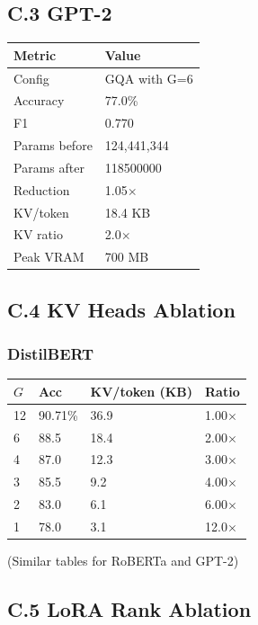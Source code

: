 \subsection{C.3 GPT-2}

\begin{table}[H]
\centering
\small
\begin{tabular}{ll}
\toprule
\textbf{Metric} & \textbf{Value} \\
\midrule
Config & GQA with G=6 \\
Accuracy & 77.0\% \\
F1 & 0.770 \\
Params before & 124,441,344 \\
Params after & 118500000 \\
Reduction & 1.05$\times$ \\
KV/token & 18.4 KB \\
KV ratio & 2.0$\times$ \\
Peak VRAM & 700 MB \\
\bottomrule
\end{tabular}
\end{table}

\subsection{C.4 KV Heads Ablation}

\subsubsection{DistilBERT}
\begin{table}[H]
\centering
\small
\begin{tabular}{llll}
\toprule
\textbf{$G$} & \textbf{Acc} & \textbf{KV/token (KB)} & \textbf{Ratio} \\
\midrule
12 & 90.71\% & 36.9 & 1.00$\times$ \\
6 & 88.5 & 18.4 & 2.00$\times$ \\
4 & 87.0 & 12.3 & 3.00$\times$ \\
3 & 85.5 & 9.2 & 4.00$\times$ \\
2 & 83.0 & 6.1 & 6.00$\times$ \\
1 & 78.0 & 3.1 & 12.0$\times$ \\
\bottomrule
\end{tabular}
\end{table}

(Similar tables for RoBERTa and GPT-2)

\subsection{C.5 LoRA Rank Ablation}

